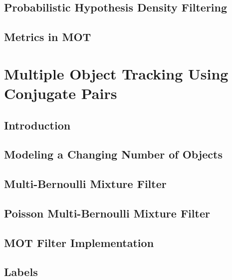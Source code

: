 \documentclass{beamer}
\begin{document}
	\subsection{Probabilistic Hypothesis Density Filtering}
	\subsection{Metrics in MOT}
	\section{Multiple Object Tracking Using Conjugate Pairs}
	\subsection{Introduction}
	\subsection{Modeling a Changing Number of Objects}
	\subsection{Multi-Bernoulli Mixture Filter}
	\subsection{Poisson Multi-Bernoulli Mixture Filter}
	\subsection{MOT Filter Implementation}
	\subsection{Labels}	
\end{document}
